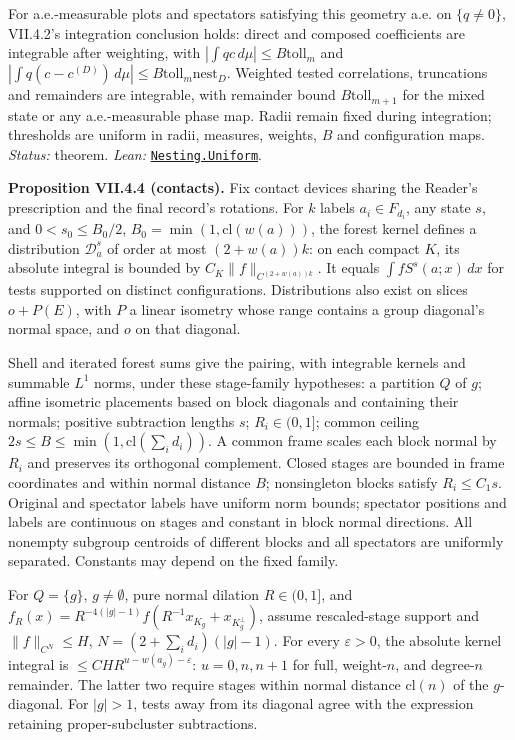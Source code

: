 \documentclass[
  letterpaper,
  11pt]{article}
\newcounter{none} %
\begin{document}
For a.e.-measurable plots and spectators satisfying this geometry a.e.
on \(\{q\ne0\}\), VII.4.2's integration conclusion holds: direct and
composed coefficients are integrable after weighting, with
\(|\int qc\,d\mu|\le B\mathrm{toll}_m\) and
\(|\int q(c-c^{(D)})\,d\mu|\le B\mathrm{toll}_m\mathrm{nest}_D\).
Weighted tested correlations, truncations and remainders are integrable,
with remainder bound \(B\mathrm{toll}_{m+1}\) for the mixed state or any
a.e.-measurable phase map. Radii remain fixed during integration;
thresholds are uniform in radii, measures, weights, \(B\) and
configuration maps. \emph{Status:} theorem. \emph{Lean:}
\href{https://github.com/yang-mills-group/OpenAI-YM-20261028/blob/3456e5e75cf8d4cd558955a5c7638fba2d68f464/YM/OPE/Nesting/Endpoint.lean\#L17-L27}{\texttt{Nesting.Uniform}}.

\textbf{Proposition VII.4.4 (contacts).} Fix contact devices sharing the
Reader's prescription and the final record's rotations. For \(k\) labels
\(a_i\in F_{d_i}\), any state \(s\), and \(0<s_0\le B_0/2\),
\(B_0=\min(1,\mathrm{cl}(w(a)))\), the forest kernel defines a
distribution \(\mathcal D_a^s\) of order at most \((2+w(a))k\): on each
compact \(K\), its absolute integral is bounded by
\(C_K\|f\|_{C^{(2+w(a))k}}\). It equals \(\int fS^s(a;x)\,dx\) for tests
supported on distinct configurations. Distributions also exist on slices
\(o+P(E)\), with \(P\) a linear isometry whose range contains a group
diagonal's normal space, and \(o\) on that diagonal.

Shell and iterated forest sums give the pairing, with integrable kernels
and summable \(L^1\) norms, under these stage-family hypotheses: a
partition \(Q\) of \(g\); affine isometric placements based on block
diagonals and containing their normals; positive subtraction lengths
\(s\); \(R_i\in(0,1]\); common ceiling
\(2s\le B\le\min(1,\mathrm{cl}(\sum_i d_i))\). A common frame scales
each block normal by \(R_i\) and preserves its orthogonal complement.
Closed stages are bounded in frame coordinates and within normal
distance \(B\); nonsingleton blocks satisfy \(R_i\le C_1s\). Original
and spectator labels have uniform norm bounds; spectator positions and
labels are continuous on stages and constant in block normal directions.
All nonempty subgroup centroids of different blocks and all spectators
are uniformly separated. Constants may depend on the fixed family.

For \(Q=\{g\}\), \(g\ne\emptyset\), pure normal dilation \(R\in(0,1]\),
and \(f_R(x)=R^{-4(|g|-1)}f(R^{-1}x_{K_g}+x_{K_g^\perp})\), assume
rescaled-stage support and \(\|f\|_{C^N}\le H\),
\(N=(2+\sum_i d_i)(|g|-1)\). For every \(\varepsilon>0\), the absolute
kernel integral is \(\le CHR^{u-w(a_g)-\varepsilon}\): \(u=0,n,n+1\) for
full, weight-\(n\), and degree-\(n\) remainder. The latter two require
stages within normal distance \(\mathrm{cl}(n)\) of the \(g\)-diagonal.
For \(|g|>1\), tests away from its diagonal agree with the expression
retaining proper-subcluster subtractions.
\end{document}
